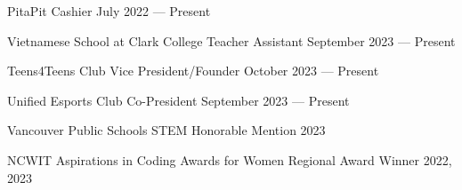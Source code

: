 PitaPit Cashier	\hfill July 2022 --- Present
 
Vietnamese School at Clark College Teacher Assistant	\hfill September 2023 --- Present

Teens4Teens Club Vice President/Founder	\hfill October 2023 --- Present

Unified Esports Club Co-President	\hfill September 2023 --- Present

Vancouver Public Schools STEM Honorable Mention	\hfill 2023

NCWIT Aspirations in Coding Awards for Women Regional Award Winner	\hfill 2022, 2023


